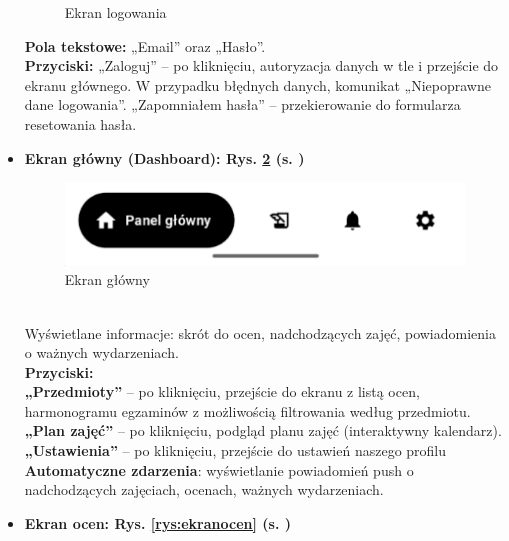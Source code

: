 \begin{itemize}
\begin{figure}[htb!]
                  \caption{Ekran logowania}
                  \label{rys:ekranlogowania}
            \end{figure}
            \newpage
            \textbf{Pola tekstowe:} „Email” oraz „Hasło”.
            \\\textbf{Przyciski:} „Zaloguj” – po kliknięciu, autoryzacja danych w tle i przejście do ekranu głównego. W przypadku błędnych danych, komunikat „Niepoprawne dane logowania”. „Zapomniałem hasła” – przekierowanie do formularza resetowania hasła.
      \item  \textbf{Ekran główny (Dashboard): Rys. \ref{rys:ekranglowny} (s. \pageref{rys:ekranglowny})}
            \begin{figure}[htb!]
                  \centering
                  \includegraphics[width=0.8\linewidth]{rys/ekranglowny.png}
                  \caption{Ekran główny}
                  \label{rys:ekranglowny}
            \end{figure}
            \\Wyświetlane informacje: skrót do ocen, nadchodzących zajęć, powiadomienia o ważnych wydarzeniach.
            \\\textbf{Przyciski:}
            \\\textbf{„Przedmioty”} – po kliknięciu, przejście do ekranu z listą ocen, harmonogramu egzaminów z możliwością filtrowania według przedmiotu.
            \\\textbf{„Plan zajęć”} – po kliknięciu, podgląd planu zajęć (interaktywny kalendarz).
            \\\textbf{„Ustawienia”} – po kliknięciu, przejście do ustawień naszego profilu
            \\\textbf{Automatyczne zdarzenia}: wyświetlanie powiadomień push o nadchodzących zajęciach, ocenach, ważnych wydarzeniach.
            \newpage
      \item \textbf{Ekran ocen:  Rys. \ref{rys:ekranocen} (s. \pageref{rys:ekranocen})}
            \begin{figure}[htb!]
                  \centering

\end{figure}
\end{itemize}
